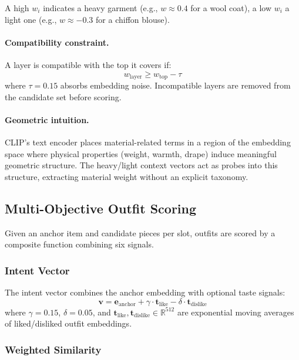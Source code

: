 \documentclass[10pt,twocolumn]{article}
\begin{document}
A high $w_i$ indicates a heavy garment (e.g., $w \approx 0.4$ for a wool
coat), a low $w_i$ a light one (e.g., $w \approx -0.3$ for a chiffon
blouse).

\paragraph{Compatibility constraint.}
A layer is compatible with the top it covers if:
\begin{equation}
  w_{\text{layer}} \geq w_{\text{top}} - \tau
\end{equation}
where $\tau = 0.15$ absorbs embedding noise.  Incompatible layers are
removed from the candidate set before scoring.

\paragraph{Geometric intuition.}
CLIP's text encoder places material-related terms in a region of the
embedding space where physical properties (weight, warmth, drape) induce
meaningful geometric structure.  The heavy/light context vectors act as
probes into this structure, extracting material weight without an explicit
taxonomy.

\subsection{Multi-Objective Outfit Scoring}
\label{sec:scoring}

Given an anchor item and candidate pieces per slot, outfits are scored by a
composite function combining six signals.

\subsubsection{Intent Vector}

The intent vector combines the anchor embedding with optional taste signals:
\begin{equation}
  \mathbf{v} = \mathbf{e}_{\text{anchor}} + \gamma \cdot
    \mathbf{t}_{\text{like}} - \delta \cdot \mathbf{t}_{\text{dislike}}
\label{eq:intent}
\end{equation}
where $\gamma = 0.15$, $\delta = 0.05$, and
$\mathbf{t}_{\text{like}}, \mathbf{t}_{\text{dislike}} \in \mathbb{R}^{512}$
are exponential moving averages of liked/disliked outfit embeddings.

\subsubsection{Weighted Similarity}
\end{document}
